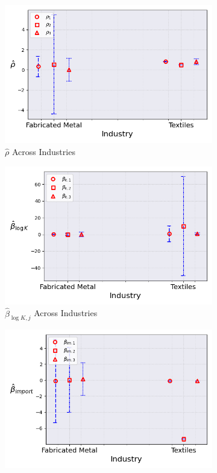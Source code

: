 \documentclass{article}
\begin{document}
\begin{figure}[ht!]
\begin{subfigure}[t]{0.32\textwidth}
        \includegraphics[width=\textwidth]{figure/ar1_mixture_kmshare_ciiu_rho_across_industries_m3.png}
        \caption{$\hat\rho$ Across Industries}
    \end{subfigure}
    \begin{subfigure}[t]{0.32\textwidth}
        \centering
        \includegraphics[width=\textwidth]{figure/ar1_mixture_kmshare_ciiu_beta_k_across_industries_m3.png}
        \caption{$\hat{\beta}_{\log K, j}$ Across Industries}
    \end{subfigure}
    \begin{subfigure}[t]{0.32\textwidth}
        \centering
        \includegraphics[width=\textwidth]{figure/ar1_mixture_kmshare_ciiu_beta_im_across_industries_m3.png}

\end{subfigure}
\end{figure}
\end{document}

